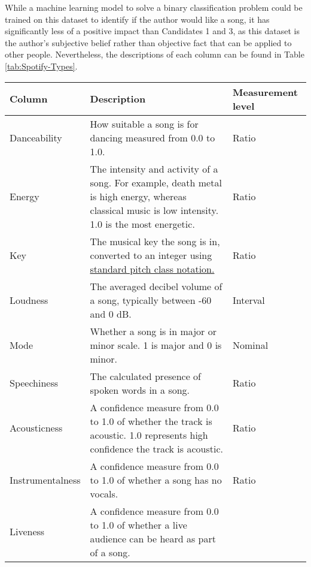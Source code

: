 While a machine learning model to solve a binary classification problem could be trained on this dataset to identify if the author would like a song, 
it has significantly less of a positive impact than Candidates 1 and 3, as this dataset is the author's subjective belief rather than objective
fact that can be applied to other people. Nevertheless, the descriptions of each column can be found in Table \ref{tab:Spotify-Types}.

\begin{table}[H]
    \centering
    \begin{tabular}{ |p{}| p{}| p{}|}
        \hline
        \cellcolor{blue!25}Column & \cellcolor{blue!25}Description & \cellcolor{blue!25}Measurement level\\
            \hline
            Danceability & How suitable a song is for dancing measured from 0.0 to 1.0.
            & Ratio \\
            \hline
            Energy & The intensity and activity of a song. For example, death metal is high energy, whereas classical music is low intensity. 1.0 is the most energetic.
            & Ratio\\
            \hline
            Key & The musical key the song is in, converted to an integer using \href{https://smbutterfield.github.io/ibmt17-18/22-intro-to-non-diatonic-materials/b2-tx-pcintnotation.html}{standard pitch class notation.}\autocite{butterfield_22b_nodate} 
            & Ratio\\
            \hline
            Loudness & The averaged decibel volume of a song, typically between -60 and 0 dB.
            & Interval\\
            \hline
            Mode & Whether a song is in major or minor scale. 1 is major and 0 is minor.
            & Nominal\\
            \hline
            Speechiness & The calculated presence of spoken words in a song.
            & Ratio\\
            \hline
            Acousticness & A confidence measure from 0.0 to 1.0 of whether the track is acoustic. 1.0 represents high confidence the track is acoustic.
            & Ratio\\
            \hline
            Instrumentalness & A confidence measure from 0.0 to 1.0 of whether a song has no vocals.
            & Ratio\\
            \hline
            Liveness & A confidence measure from 0.0 to 1.0 of whether a live audience can be heard as part of a song.

\end{tabular}
\end{table}
